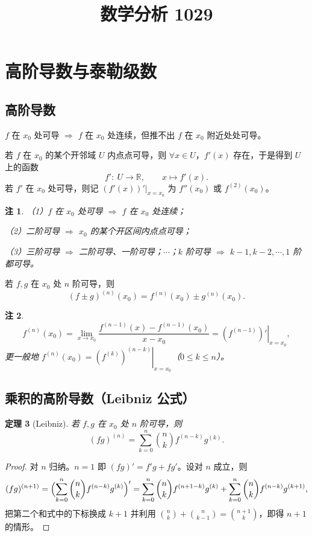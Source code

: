 \documentclass[UTF8,11pt]{ctexart}
\title{数学分析 1029}
\date{}
\theoremstyle{cnthm}
\newtheorem{thm}{定理}[section]
\newtheorem{rem}[thm]{注}
\begin{document}
\maketitle

\section{高阶导数与泰勒级数}

\subsection{高阶导数}

$f$ 在 $x_0$ 处可导 $\Rightarrow$ $f$ 在 $x_0$ 处连续，但推不出 $f$ 在 $x_0$ 附近处处可导。

若 $f$ 在 $x_0$ 的某个开邻域 $U$ 内点点可导，则 $\forall x\in U$，$f'(x)$ 存在，于是得到 $U$ 上的函数
\[
f':\ U\to\mathbb{R},\qquad x\longmapsto f'(x).
\]
若 $f'$ 在 $x_0$ 处可导，则记 $(f'(x))'|_{x=x_0}$ 为 $f''(x_0)$ 或 $f^{(2)}(x_0)$。

\begin{rem}
（1）$f$ 在 $x_0$ 处可导 $\Rightarrow$ $f$ 在 $x_0$ 处连续；

（2）二阶可导 $\Rightarrow$ $x_0$ 的某个开区间内点点可导；

（3）三阶可导 $\Rightarrow$ 二阶可导、一阶可导；$\cdots$；$k$ 阶可导 $\Rightarrow$ $k-1,k-2,\cdots,1$ 阶都可导。
\end{rem}

若 $f,g$ 在 $x_0$ 处 $n$ 阶可导，则
\[
(f\pm g)^{(n)}(x_0)=f^{(n)}(x_0)\pm g^{(n)}(x_0).
\]

\begin{rem}
\[
f^{(n)}(x_0)=\lim_{x\to x_0}\frac{f^{(n-1)}(x)-f^{(n-1)}(x_0)}{x-x_0}
=\left.(f^{(n-1)})'\right|_{x=x_0},
\]
更一般地 $f^{(n)}(x_0)=\left.(f^{(k)})^{(n-k)}\right|_{x=x_0}$（$0\leq k\leq n$）。
\end{rem}

\subsection{乘积的高阶导数（Leibniz 公式）}

\begin{thm}[Leibniz]
若 $f,g$ 在 $x_0$ 处 $n$ 阶可导，则
\[
(fg)^{(n)}=\sum_{k=0}^{n}\binom{n}{k}f^{(n-k)}g^{(k)} .
\]
\end{thm}

\begin{proof}
对 $n$ 归纳。$n=1$ 即 $(fg)'=f'g+fg'$。设对 $n$ 成立，则
\[
(fg)^{(n+1)}=\Bigl(\sum_{k=0}^{n}\binom{n}{k}f^{(n-k)}g^{(k)}\Bigr)'
=\sum_{k=0}^{n}\binom{n}{k}f^{(n+1-k)}g^{(k)}+\sum_{k=0}^{n}\binom{n}{k}f^{(n-k)}g^{(k+1)},
\]
把第二个和式中的下标换成 $k+1$ 并利用 $\binom{n}{k}+\binom{n}{k-1}=\binom{n+1}{k}$，即得 $n+1$ 的情形。
\end{proof}
\end{document}
